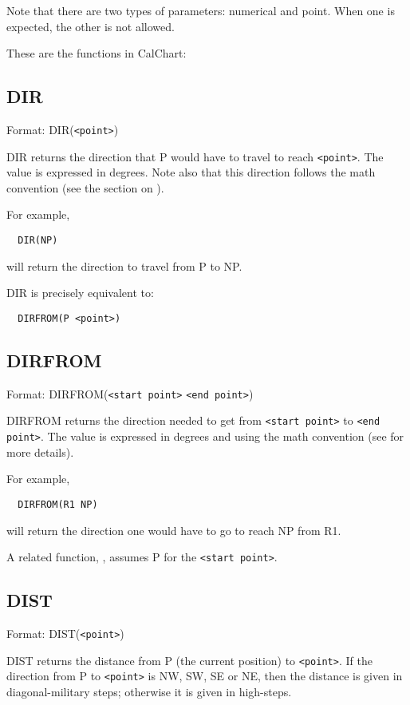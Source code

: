 Note that there are two types of parameters: numerical and point.
When one is expected, the other is not allowed.

These are the functions in CalChart:

\subsection{DIR}\label{dir}

Format: DIR(\verb$<point>$)

DIR returns the direction that P would have to travel to reach \verb$<point>$.
The value is expressed in degrees.  Note also that this direction follows
the math convention (see the section on ).

For example,
\begin{verbatim}
  DIR(NP)
\end{verbatim}
will return the direction to travel from P to NP.

DIR is precisely equivalent to:
\begin{verbatim}
  DIRFROM(P <point>)
\end{verbatim}

\subsection{DIRFROM}\label{dirfrom}

Format: DIRFROM(\verb$<start point>$ \verb$<end point>$)

DIRFROM returns the direction needed to get from \verb$<start point>$ to
\verb$<end point>$. The value is expressed in degrees and using the math
convention (see  for more details).

For example,
\begin{verbatim}
  DIRFROM(R1 NP)
\end{verbatim}
will return the direction one would have to go to reach NP from R1.

A related function, , assumes P for the \verb$<start point>$.

\subsection{DIST}\label{dist}

Format: DIST(\verb$<point>$)

DIST returns the distance from P (the current position) to \verb$<point>$.
If the direction from P to \verb$<point>$ is NW, SW, SE or NE, then the
distance is given in diagonal-military steps; otherwise it is given in
high-steps.

